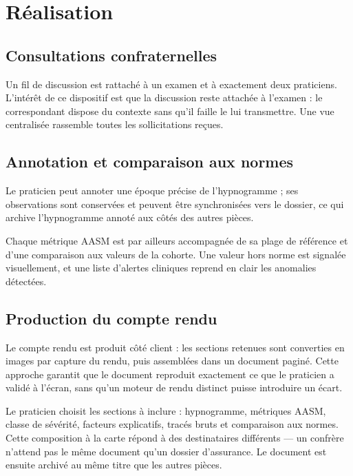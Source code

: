 \section{Réalisation}

\subsection{Consultations confraternelles}

Un fil de discussion est rattaché à un examen et à exactement deux praticiens. L'intérêt de ce
dispositif est que la discussion reste attachée à l'examen : le correspondant dispose du
contexte sans qu'il faille le lui transmettre. Une vue centralisée rassemble toutes les
sollicitations reçues.


\subsection{Annotation et comparaison aux normes}

Le praticien peut annoter une époque précise de l'hypnogramme ; ses observations sont
conservées et peuvent être synchronisées vers le dossier, ce qui archive l'hypnogramme annoté
aux côtés des autres pièces.

Chaque métrique AASM est par ailleurs accompagnée de sa plage de référence et d'une comparaison
aux valeurs de la cohorte. Une valeur hors norme est signalée visuellement, et une liste
d'alertes cliniques reprend en clair les anomalies détectées.

\subsection{Production du compte rendu}

Le compte rendu est produit côté client : les sections retenues sont converties en images par
capture du rendu, puis assemblées dans un document paginé. Cette approche garantit que le
document reproduit exactement ce que le praticien a validé à l'écran, sans qu'un moteur de
rendu distinct puisse introduire un écart.

Le praticien choisit les sections à inclure : hypnogramme, métriques AASM, classe de sévérité,
facteurs explicatifs, tracés bruts et comparaison aux normes. Cette composition à la carte
répond à des destinataires différents --- un confrère n'attend pas le même document qu'un
dossier d'assurance. Le document est ensuite archivé au même titre que les autres pièces.

